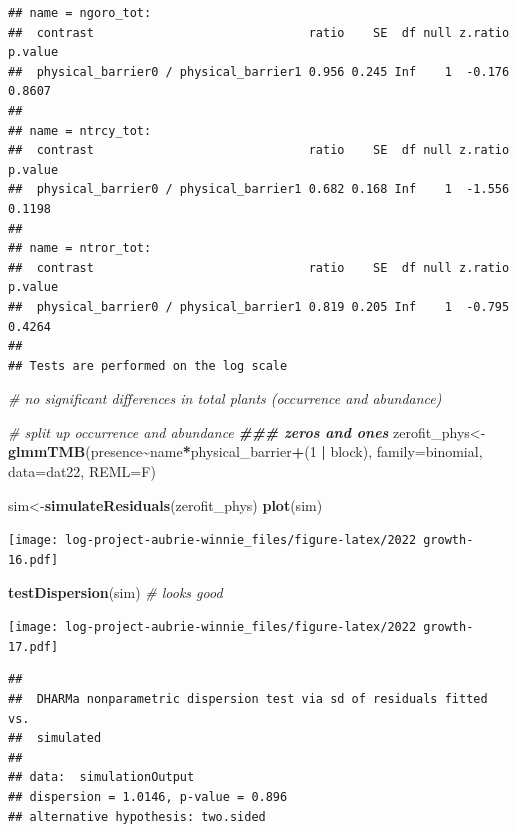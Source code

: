 \documentclass[
]{article}
\newenvironment{Shaded}{\begin{snugshade}}{\end{snugshade}}
\newcommand{\AttributeTok}[1]{\textcolor[rgb]{0.13,0.29,0.53}{#1}}
\newcommand{\CommentTok}[1]{\textcolor[rgb]{0.56,0.35,0.01}{\textit{#1}}}
\newcommand{\DecValTok}[1]{\textcolor[rgb]{0.00,0.00,0.81}{#1}}
\newcommand{\DocumentationTok}[1]{\textcolor[rgb]{0.56,0.35,0.01}{\textbf{\textit{#1}}}}
\newcommand{\FunctionTok}[1]{\textcolor[rgb]{0.13,0.29,0.53}{\textbf{#1}}}
\newcommand{\NormalTok}[1]{#1}
\newcommand{\OtherTok}[1]{\textcolor[rgb]{0.56,0.35,0.01}{#1}}
\newcommand{\SpecialCharTok}[1]{\textcolor[rgb]{0.81,0.36,0.00}{\textbf{#1}}}
\begin{document}
\begin{verbatim}
## name = ngoro_tot:
##  contrast                              ratio    SE  df null z.ratio p.value
##  physical_barrier0 / physical_barrier1 0.956 0.245 Inf    1  -0.176  0.8607
## 
## name = ntrcy_tot:
##  contrast                              ratio    SE  df null z.ratio p.value
##  physical_barrier0 / physical_barrier1 0.682 0.168 Inf    1  -1.556  0.1198
## 
## name = ntror_tot:
##  contrast                              ratio    SE  df null z.ratio p.value
##  physical_barrier0 / physical_barrier1 0.819 0.205 Inf    1  -0.795  0.4264
## 
## Tests are performed on the log scale
\end{verbatim}

\begin{Shaded}
\begin{Highlighting}[]
\CommentTok{\# no significant differences in total plants (occurrence and abundance) }

\CommentTok{\# split up occurrence and abundance}
\DocumentationTok{\#\#\# zeros and ones }
\NormalTok{zerofit\_phys}\OtherTok{\textless{}{-}}\FunctionTok{glmmTMB}\NormalTok{(presence}\SpecialCharTok{\textasciitilde{}}\NormalTok{name}\SpecialCharTok{*}\NormalTok{physical\_barrier}\SpecialCharTok{+}\NormalTok{(}\DecValTok{1} \SpecialCharTok{|}\NormalTok{ block), }\AttributeTok{family=}\NormalTok{binomial, }\AttributeTok{data=}\NormalTok{dat22, }\AttributeTok{REML=}\NormalTok{F)}

\NormalTok{sim}\OtherTok{\textless{}{-}}\FunctionTok{simulateResiduals}\NormalTok{(zerofit\_phys)}
\FunctionTok{plot}\NormalTok{(sim)}
\end{Highlighting}
\end{Shaded}

\texttt{[image: log-project-aubrie-winnie\_files/figure-latex/2022 growth-16.pdf]}

\begin{Shaded}
\begin{Highlighting}[]
\FunctionTok{testDispersion}\NormalTok{(sim) }\CommentTok{\# looks good}
\end{Highlighting}
\end{Shaded}

\texttt{[image: log-project-aubrie-winnie\_files/figure-latex/2022 growth-17.pdf]}

\begin{verbatim}
## 
##  DHARMa nonparametric dispersion test via sd of residuals fitted vs.
##  simulated
## 
## data:  simulationOutput
## dispersion = 1.0146, p-value = 0.896
## alternative hypothesis: two.sided
\end{verbatim}
\end{document}
